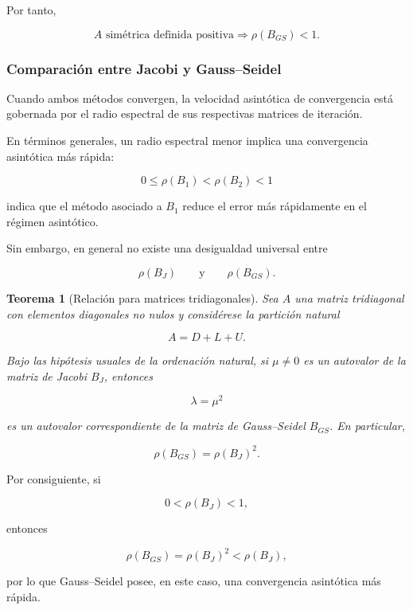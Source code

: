 \documentclass[12pt]{article}
\newtheorem{teorema}{Teorema}
\begin{document}
Por tanto,

\[
    \boxed{
    A\text{ simétrica definida positiva}
    \Longrightarrow
    \rho(B_{GS})<1.
    }
\]


\subsubsection*{Comparación entre Jacobi y Gauss--Seidel}

Cuando ambos métodos convergen, la velocidad asintótica de convergencia
está gobernada por el radio espectral de sus respectivas matrices de
iteración.

En términos generales, un radio espectral menor implica una
convergencia asintótica más rápida:

\[
    0\leq\rho(B_1)<\rho(B_2)<1
\]

indica que el método asociado a $B_1$ reduce el error más rápidamente
en el régimen asintótico.

Sin embargo, en general no existe una desigualdad universal entre

\[
    \rho(B_J)
    \qquad\text{y}\qquad
    \rho(B_{GS}).
\]


\begin{teorema}[Relación para matrices tridiagonales]
Sea $A$ una matriz tridiagonal con elementos diagonales no nulos y
considérese la partición natural

\[
    A=D+L+U.
\]

Bajo las hipótesis usuales de la ordenación natural, si $\mu\neq0$ es
un autovalor de la matriz de Jacobi $B_J$, entonces

\[
    \lambda=\mu^2
\]

es un autovalor correspondiente de la matriz de Gauss--Seidel
$B_{GS}$. En particular,

\[
    \boxed{
    \rho(B_{GS})
    =
    \rho(B_J)^2.
    }
\]
\end{teorema}

Por consiguiente, si

\[
    0<\rho(B_J)<1,
\]

entonces

\[
    \rho(B_{GS})
    =
    \rho(B_J)^2
    <
    \rho(B_J),
\]

por lo que Gauss--Seidel posee, en este caso, una convergencia
asintótica más rápida.


\end{document}
